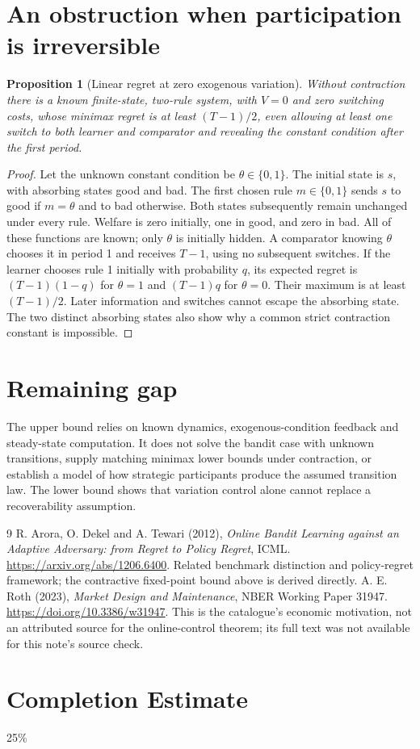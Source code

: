 \documentclass[11pt]{article}
\newtheorem{proposition}[theorem]{Proposition}
\theoremstyle{definition}
\theoremstyle{remark}
\begin{document}
\section{An obstruction when participation is irreversible}
\begin{proposition}[Linear regret at zero exogenous variation]
Without contraction there is a known finite-state, two-rule system, with $V=0$ and zero switching costs, whose minimax regret is at least $(T-1)/2$, even allowing at least one switch to both learner and comparator and revealing the constant condition after the first period.
\end{proposition}
\begin{proof}
Let the unknown constant condition be $\theta\in\{0,1\}$. The initial state is $s$, with absorbing states good and bad. The first chosen rule $m\in\{0,1\}$ sends $s$ to good if $m=\theta$ and to bad otherwise. Both states subsequently remain unchanged under every rule. Welfare is zero initially, one in good, and zero in bad. All of these functions are known; only $\theta$ is initially hidden. A comparator knowing $\theta$ chooses it in period 1 and receives $T-1$, using no subsequent switches. If the learner chooses rule 1 initially with probability $q$, its expected regret is $(T-1)(1-q)$ for $\theta=1$ and $(T-1)q$ for $\theta=0$. Their maximum is at least $(T-1)/2$. Later information and switches cannot escape the absorbing state. The two distinct absorbing states also show why a common strict contraction constant is impossible.
\end{proof}

\section{Remaining gap}
The upper bound relies on known dynamics, exogenous-condition feedback and steady-state computation. It does not solve the bandit case with unknown transitions, supply matching minimax lower bounds under contraction, or establish a model of how strategic participants produce the assumed transition law. The lower bound shows that variation control alone cannot replace a recoverability assumption.

\begin{thebibliography}{9}
 R. Arora, O. Dekel and A. Tewari (2012), \emph{Online Bandit Learning against an Adaptive Adversary: from Regret to Policy Regret}, ICML. \url{https://arxiv.org/abs/1206.6400}. Related benchmark distinction and policy-regret framework; the contractive fixed-point bound above is derived directly.
 A. E. Roth (2023), \emph{Market Design and Maintenance}, NBER Working Paper 31947. \url{https://doi.org/10.3386/w31947}. This is the catalogue's economic motivation, not an attributed source for the online-control theorem; its full text was not available for this note's source check.
\end{thebibliography}
\section{Completion Estimate}
25\%
\end{document}
